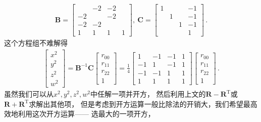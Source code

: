 \begin{align}
    \bm B=\left[\begin{array}{rrrr}
               & -2 & -2 &   \\
            -2 &    & -2 &   \\
            -2 & -2 &    &   \\
            1  & 1  & 1  & 1
        \end{array}\right],\
    \bm C=\left[\begin{array}{rrrr}
            1 &   &   & -1 \\
              & 1 &   & -1 \\
              &   & 1 & -1 \\
              &   &   & 1
        \end{array}\right]\, .
\end{align}
这个方程组不难解得
\begin{align}\label{eq:02ex.2}
    \left[\begin{array}{c}
            x^2 \\y^2\\z^2\\w^2
        \end{array}\right]=\bm B^{-1}\bm C\left[\begin{array}{c}
            r_{00} \\r_{11}\\r_{22}\\1
        \end{array}\right]=\frac{1}{4}\left[\begin{array}{rrrr}
            1  & -1 & -1 & 1 \\
            -1 & 1  & -1 & 1 \\
            -1 & -1 & 1  & 1 \\
            1  & 1  & 1  & 1
        \end{array}\right]\left[\begin{array}{c}
            r_{00} \\r_{11}\\r_{22}\\1
        \end{array}\right]\, .
\end{align}
虽然我们可以从$x^2,y^2,z^2,w^2$中任解一项并开方，
然后利用上文的$\bm R-\bm R^\mathrm{T}$或$\bm R+\bm R^\mathrm{T}$求解出其他项，
但是考虑到开方运算一般比除法的开销大，我们希望最高效地利用这次开方运算——
选最大的一项开方，
